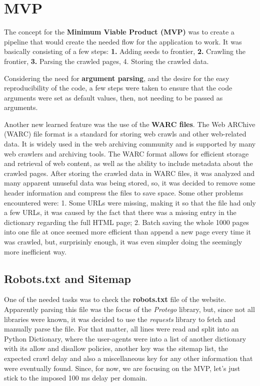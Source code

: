 \section{MVP}

The concept for the \textbf{Minimum Viable Product (MVP)} was to create a pipeline that would create the needed flow for the application to work. It was basically consisting of a few steps: \textbf{1.} Adding seeds to frontier, \textbf{2.} Crawling the frontier, \textbf{3.} Parsing the crawled pages, 4. Storing the crawled data.

Considering the need for \textbf{argument parsing}, and the desire for the easy reproducibility of the code, a few steps were taken to ensure that the code arguments were set as default values, then, not needing to be passed as arguments.

Another new learned feature was the use of the \textbf{WARC files}. The Web ARChive (WARC) file format is a standard for storing web crawls and other web-related data. It is widely used in the web archiving community and is supported by many web crawlers and archiving tools. The WARC format allows for efficient storage and retrieval of web content, as well as the ability to include metadata about the crawled pages. After storing the crawled data in WARC files, it was analyzed and many apparent unuseful data was being stored, so, it was decided to remove some header information and compress the files to save space. Some other problems encountered were: 1. Some URLs were missing, making it so that the file had only a few URLs, it was caused by the fact that there was a missing entry in the dictionary regarding the full HTML page; 2. Batch saving the whole 1000 pages into one file at once seemed more efficient than append a new page every time it was crawled, but, surprisinly enough, it was even simpler doing the seemingly more inefficient way.

\subsection{Robots.txt and Sitemap}

One of the needed tasks was to check the \textbf{robots.txt} file of the website. Apparently parsing this file was the focus of the \textit{Protego} library, but, since not all libraries were known, it was decided to use the \textit{requests} library to fetch and manually parse the file. For that matter, all lines were read and split into an Python Dictionary, where the user-agents were into a list of another dictionary with its allow and disallow policies, another key was the sitemap list, the expected crawl delay and also a miscellaneous key for any other information that were eventually found. Since, for now, we are focusing on the MVP, let's just stick to the imposed 100 ms delay per domain.

